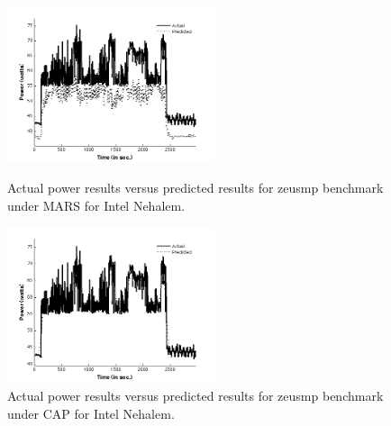\documentclass[times,10pt,finalversion]{usetex-v1}
\begin{document}
\begin{figure}[bth]
  \begin{minipage}[b]{0.5\linewidth}
    \centering
    \includegraphics[width=1.0\linewidth,height=1.8in]{intelzeusmars}
    \caption{Actual power results versus predicted results for zeusmp
      benchmark under MARS for Intel Nehalem.}
    \label{fig:intelzeusmars}
  \end{minipage}\quad
  \begin{minipage}[b]{0.5\linewidth}
    \centering
    \includegraphics[width=1.0\linewidth,height=1.8in]{intelzeuspredict}
    \caption{Actual power results versus predicted results for zeusmp
      benchmark under CAP for Intel Nehalem.}
    \label{fig:intelzeuspredict}
  \end{minipage}
\end{figure}
\end{document}
